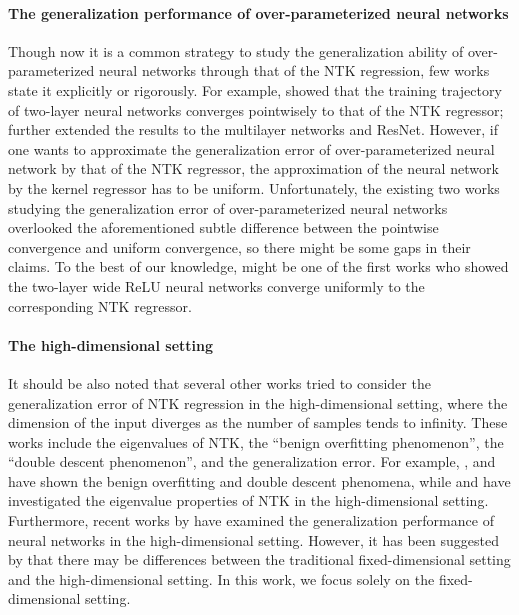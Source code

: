 \paragraph{The generalization performance of over-parameterized neural networks}

Though now it is a common strategy to study the generalization ability of over-parameterized neural networks through that of the NTK regression,
few works state it explicitly or rigorously.
For example, \citet{du2018_GradientDescent,li2018_LearningOverparameterized,arora2019_FinegrainedAnalysis}
showed that the training trajectory of two-layer neural networks converges pointwisely to that of the NTK regressor;
\citet{du2019_GradientDescent,allen-zhu2019_ConvergenceRate,lee2019_WideNeural} further extended the results to the multilayer networks and ResNet.
However, if one wants to approximate the generalization error of over-parameterized neural network by that of the NTK regressor,
the approximation of the neural network by the kernel regressor has to be uniform.
Unfortunately, the existing two works~\citep{hu2021_RegularizationMatters,suh2022_NonparametricRegression}
studying the generalization error of over-parameterized neural networks
overlooked the aforementioned subtle difference between the pointwise convergence and uniform convergence,
so there might be some gaps in their claims.
To the best of our knowledge, \citet{lai2023_GeneralizationAbility} might be one of the first works who showed the two-layer wide ReLU neural networks converge uniformly to the corresponding NTK regressor.


\paragraph{The high-dimensional setting}
It should be also noted that several other works tried to consider the generalization error of NTK regression in the high-dimensional setting,
where the dimension of the input diverges as the number of samples tends to infinity.
These works include the eigenvalues of NTK, the ``benign overfitting phenomenon'', the ``double descent phenomenon'',
and the generalization error.
For example, \citet{frei2022_BenignOverfitting}, \citet{nakkiran2019_DeepDouble} and \citet{liang2020_JustInterpolate}
have shown the benign overfitting and double descent phenomena, while \citet{fan2020_SpectraConjugate} and \citet{nguyen2021_TightBounds}
have investigated the eigenvalue properties of NTK in the high-dimensional setting.
Furthermore, recent works by \citet{montanari2022_InterpolationPhase} have examined the generalization performance of neural networks in the high-dimensional setting.
However, it has been suggested by \citet{rakhlin2018_ConsistencyInterpolation,beaglehole2022_KernelRidgeless}
that there may be differences between the traditional fixed-dimensional setting and the high-dimensional setting.
In this work, we focus solely on the fixed-dimensional setting.


